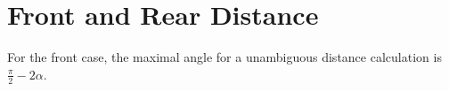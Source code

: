 \section{Front and Rear Distance}
\label{sec:03_distance}

For the front case, the maximal angle for a unambiguous distance calculation
is $\frac{\pi}{2}- 2\alpha$.